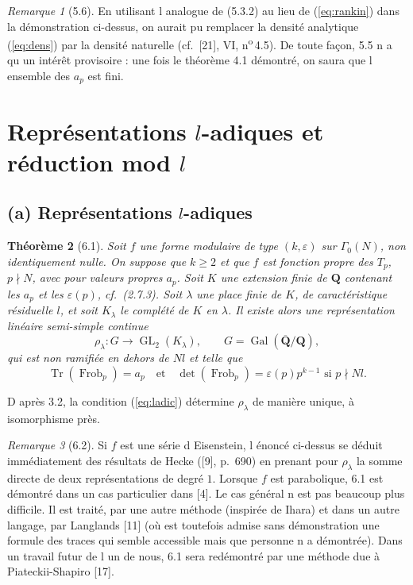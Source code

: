 \documentclass[11pt]{amsart}
\theoremstyle{plain}
\newtheorem{theoreme}{Théorème}[section]
\theoremstyle{definition}
\theoremstyle{remark}
\newtheorem{remarque}[theoreme]{Remarque}
\DeclareMathOperator{\Gal}{Gal}
\DeclareMathOperator{\GL}{GL}
\DeclareMathOperator{\Tr}{Tr}
\DeclareMathOperator{\frob}{Frob}
\newcommand{\Q}{\mathbf{Q}}
\begin{document}
\begin{remarque}[5.6]
En utilisant l analogue de (5.3.2) au lieu de (\ref{eq:rankin}) dans la d\'emonstration ci-dessus, on aurait pu remplacer la densit\'e analytique (\ref{eq:dens}) par la densit\'e naturelle (cf.~[21], VI, n\textsuperscript{o}\,4.5). De toute fa\c{c}on, 5.5 n a qu un int\'er\^et provisoire : une fois le th\'eor\`eme 4.1 d\'emontr\'e, on saura que l ensemble des $a_p$ est fini.
\end{remarque}

\section{Repr\'esentations $l$-adiques et r\'eduction mod $l$}

\subsection*{(a) Repr\'esentations $l$-adiques}

\begin{theoreme}[6.1]
Soit $f$ une forme modulaire de type $(k,\varepsilon)$ sur $\Gamma_0(N)$, non identiquement nulle. On suppose que $k \ge 2$ et que $f$ est fonction propre des $T_p$, $p \nmid N$, avec pour valeurs propres $a_p$. Soit $K$ une extension finie de $\Q$ contenant les $a_p$ et les $\varepsilon(p)$, cf.~(2.7.3). Soit $\lambda$ une place finie de $K$, de caract\'eristique r\'esiduelle $l$, et soit $K_\lambda$ le compl\'et\'e de $K$ en $\lambda$. Il existe alors une repr\'esentation lin\'eaire semi-simple continue
$$\rho_\lambda : G \longrightarrow \GL_2(K_\lambda), \qquad G = \Gal(\overline{\Q}/\Q),$$
qui est non ramifi\'ee en dehors de $Nl$ et telle que
\begin{equation}\label{eq:ladic}\Tr(\frob_p) = a_p \quad \text{et} \quad \det(\frob_p) = \varepsilon(p) p^{k-1} \text{ si } p \nmid Nl.\end{equation}
\end{theoreme}

D apr\`es 3.2, la condition (\ref{eq:ladic}) d\'etermine $\rho_\lambda$ de mani\`ere unique, \`a isomorphisme pr\`es.

\begin{remarque}[6.2]
Si $f$ est une s\'erie d Eisenstein, l \'enonc\'e ci-dessus se d\'eduit imm\'ediatement des r\'esultats de Hecke ([9], p.~690) en prenant pour $\rho_\lambda$ la somme directe de deux repr\'esentations de degr\'e $1$. Lorsque $f$ est parabolique, 6.1 est d\'emontr\'e dans un cas particulier dans [4]. Le cas g\'en\'eral n est pas beaucoup plus difficile. Il est trait\'e, par une autre m\'ethode (inspir\'ee de Ihara) et dans un autre langage, par Langlands [11] (o\`u est toutefois admise sans d\'emonstration une formule des traces qui semble accessible mais que personne n a d\'emontr\'ee). Dans un travail futur de l un de nous, 6.1 sera red\'emontr\'e par une m\'ethode due \`a Piateckii-Shapiro [17].
\end{remarque}
\end{document}
